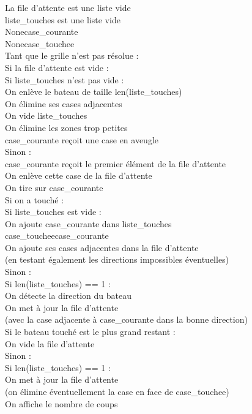 \begin{algo1}
La file d'attente est une liste vide\\
liste\_touches est une liste vide\\
None\sto case\_courante\\
None\sto case\_touchee\\
Tant que le grille n'est pas résolue :\\
Si la file d'attente est vide :\\
Si liste\_touches n'est pas vide :\\
On enlève le bateau de taille len(liste\_touches)\\
On élimine ses cases adjacentes\\
On vide liste\_touches\\
On élimine les zones trop petites\\
case\_courante reçoit une case en aveugle\\
Sinon :\\
case\_courante reçoit le premier élément de la file d'attente\\
On enlève cette case de la file d'attente\\
On tire sur case\_courante\\
Si on a touché :\\
Si liste\_touches est vide :\\
On ajoute case\_courante dans liste\_touches\\
case\_touchee\sto case\_courante\\
On ajoute ses cases adjacentes dans la file d'attente\\
(en testant également les directions impossibles éventuelles)\\
Sinon :\\
Si len(liste\_touches) == 1 :\\
On détecte la direction du bateau\\
On met à jour la file d'attente\\
(avec la case adjacente à case\_courante dans la bonne direction)\\
Si le bateau touché est le plus grand restant :\\
On vide la file d'attente\\
Sinon :\\
Si len(liste\_touches) == 1 :\\
On met à jour la file d'attente\\
(on élimine éventuellement la case en face de case\_touchee)\\
On affiche le nombre de coups\\
\end{algo1}

